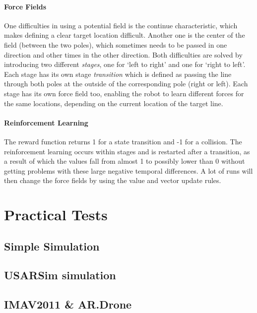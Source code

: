 \documentclass[11pt]{article}
\begin{document}
\paragraph{Force Fields}
One difficulties in using a potential field is the continue characteristic, which makes defining a clear target location difficult. Another one is the center of the field (between the two poles), which sometimes needs to be passed in one direction and other times in the other direction. Both difficulties are solved by introducing two different \emph{stages}, one for `left to right' and one for `right to left'. Each stage has its own stage \emph{transition} which is defined as passing the line through both poles at the outside of the corresponding pole (right or left). Each stage has its own force field too, enabling the robot to learn different forces for the same locations, depending on the current location of the target line.

\paragraph{Reinforcement Learning}
The reward function returns 1 for a state transition and -1 for a collision. The reinforcement learning occurs within stages and is restarted after a transition, as a result of which the values fall from almost 1 to possibly lower than 0 without getting problems with these large negative temporal differences. A lot of runs will then change the force fields by using the value and vector update rules.



\section{Practical Tests}
\label{sec:tests}


\subsection{Simple Simulation}

\subsection{USARSim simulation}

\subsection{IMAV2011 \& AR.Drone}
\end{document}
